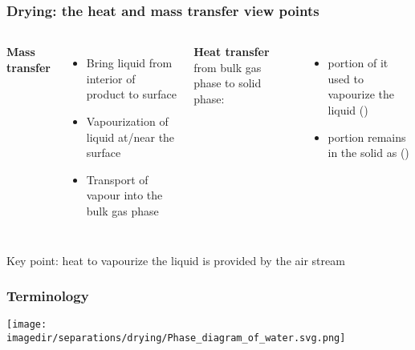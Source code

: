 \begin{frame}\frametitle{Drying: the heat and mass transfer view points}
	
	\begin{exampleblock}{}
		\begin{center}
			{\color{myGreen}{Both heat and mass transfer occur simultaneously}}
		\end{center}
	\end{exampleblock}
	
	\vspace{12pt}
	\begin{columns}[t]
			\textbf{Mass transfer}
			\begin{itemize}
				\item	Bring liquid from interior of product to surface
				\item	Vapourization of liquid at/near the surface
				\item	Transport of vapour into the bulk gas phase
			\end{itemize}
			\textbf{Heat transfer} from bulk gas phase to solid phase: 
			\begin{itemize}
				\item	portion of it used to vapourize the liquid ({\color{purple}{latent heat}})
				\item	portion remains in the solid as ({\color{purple}{sensible heat}})
			\end{itemize}
	\end{columns}
	\vspace{24pt}
	Key point: heat to vapourize the liquid is provided by the air stream
\end{frame}

\begin{frame}\frametitle{Terminology}
	\begin{center}
		\texttt{[image: \\imagedir/separations/drying/Phase\_diagram\_of\_water.svg.png]}
	\end{center}
\end{frame}

